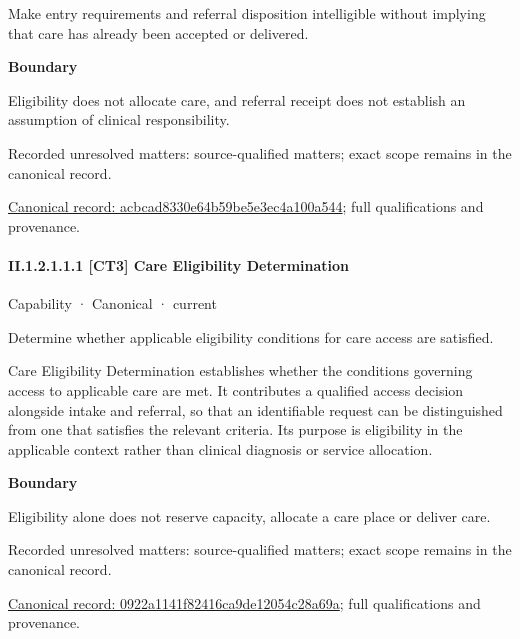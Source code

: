 Make entry requirements and referral disposition intelligible without implying that care has already been accepted or delivered.



\textbf{Boundary}



Eligibility does not allocate care, and referral receipt does not establish an assumption of clinical responsibility.


{\small Recorded unresolved matters: source-qualified matters; exact scope remains in the canonical record.}\par
{\footnotesize \href{../../../../../../../continuum/strategy/capability/acbcad8330e64b59be5e3ec4a100a544.md}{Canonical record: acbcad8330e64b59be5e3ec4a100a544}; full qualifications and provenance.}\par
\paragraph*{II.1.2.1.1.1 [CT3] Care Eligibility Determination}
\label{navigation:II.1.2.1.1.1}

\label{element:0922a1141f82416ca9de12054c28a69a}
{\small Capability · Canonical · current}\par

Determine whether applicable eligibility conditions for care access are satisfied.



Care Eligibility Determination establishes whether the conditions governing access to applicable care are met. It contributes a qualified access decision alongside intake and referral, so that an identifiable request can be distinguished from one that satisfies the relevant criteria. Its purpose is eligibility in the applicable context rather than clinical diagnosis or service allocation.



\textbf{Boundary}



Eligibility alone does not reserve capacity, allocate a care place or deliver care.


{\small Recorded unresolved matters: source-qualified matters; exact scope remains in the canonical record.}\par
{\footnotesize \href{../../../../../../../continuum/strategy/capability/0922a1141f82416ca9de12054c28a69a.md}{Canonical record: 0922a1141f82416ca9de12054c28a69a}; full qualifications and provenance.}\par
